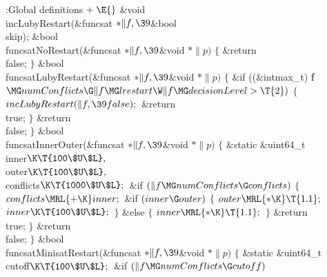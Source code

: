 {{{{{\Y\B\4:Global definitions\X${}\mathrel+\E{}$\6
\&{void} \\{incLubyRestart}(\&{funcsat} ${}{*}\|f,\39{}$\&{bool} \\{skip});\7
\&{bool} \\{funcsatNoRestart}(\&{funcsat} ${}{*}\|f,\39{}$\&{void} ${}{*}%
\|p){}$\1\1\2\2\6
${}\{{}$\1\6
\&{return} \\{false};\6
\4${}\}{}$\2\7
\&{bool} \\{funcsatLubyRestart}(\&{funcsat} ${}{*}\|f,\39{}$\&{void} ${}{*}%
\|p){}$\1\1\2\2\6
${}\{{}$\1\6
\&{if} ((\&{intmax\_t}) \|f${}\MG\\{numConflicts}\G\|f\MG\\{lrestart}\W\|f\MG%
\\{decisionLevel}>\T{2}){}$\5
${}\{{}$\1\6
${}\\{incLubyRestart}(\|f,\39\\{false});{}$\6
\&{return} \\{true};\6
\4${}\}{}$\2\6
\&{return} \\{false};\6
\4${}\}{}$\2\7
\&{bool} \\{funcsatInnerOuter}(\&{funcsat} ${}{*}\|f,\39{}$\&{void} ${}{*}%
\|p){}$\1\1\2\2\6
${}\{{}$\1\6
\&{static} \&{uint64\_t} \\{inner}${}\K\T{100\$U\$L},{}$ \\{outer}${}\K\T{100%
\$U\$L},{}$ \\{conflicts}${}\K\T{1000\$U\$L};{}$\7
\&{if} ${}(\|f\MG\\{numConflicts}\G\\{conflicts}){}$\5
${}\{{}$\1\6
${}\\{conflicts}\MRL{+{\K}}\\{inner};{}$\6
\&{if} ${}(\\{inner}\G\\{outer}){}$\5
${}\{{}$\1\6
${}\\{outer}\MRL{*{\K}}\T{1.1};{}$\6
${}\\{inner}\K\T{100\$U\$L};{}$\6
\4${}\}{}$\2\6
\&{else}\5
${}\{{}$\1\6
${}\\{inner}\MRL{*{\K}}\T{1.1};{}$\6
\4${}\}{}$\2\6
\&{return} \\{true};\6
\4${}\}{}$\2\6
\&{return} \\{false};\6
\4${}\}{}$\2\7
\&{bool} \\{funcsatMinisatRestart}(\&{funcsat} ${}{*}\|f,\39{}$\&{void} ${}{*}%
\|p){}$\1\1\2\2\6
${}\{{}$\1\6
\&{static} \&{uint64\_t} \\{cutoff}${}\K\T{100\$U\$L};{}$\7
\&{if} ${}(\|f\MG\\{numConflicts}\G\\{cutoff}){}$\5
}}}}}
